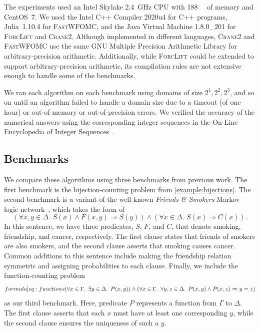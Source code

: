 \documentclass[a4paper,UKenglish,cleveref,autoref,table]{lipics-v2021}
\newcommand{\Cranetwo}{\textsc{Crane2}}
\newcommand{\friends}{\emph{Friends \& Smokers}}
\begin{document}
The experiments used an Intel Skylake \SI{2.4}{\giga\hertz} CPU with
\SI{188}{\gibi\byte} of memory and CentOS~7. We used the Intel C++ Compiler
2020u4 for C++ programs, Julia~1.10.4 for \textsc{FastWFOMC}, and the Java
Virtual Machine 1.8.0\_201 for \textsc{ForcLift} and \Cranetwo{}. Although
implemented in different languages, \Cranetwo{} and \textsc{FastWFOMC} use the
same GNU Multiple Precision Arithmetic Library for arbitrary-precision
arithmetic. Additionally, while \textsc{ForcLift} could be extended to support
arbitrary-precision arithmetic, its compilation rules are not extensive enough
to handle some of the benchmarks.

We ran each algorithm on each benchmark using domains of size
$2^{1}, 2^{2}, 2^{3}$, and so on until an algorithm failed to handle a domain
size due to a timeout (of one hour) or out-of-memory or out-of-precision errors.
We verified the accuracy of the numerical answers using the corresponding
integer sequences in the On-Line Encyclopedia of Integer Sequences~\cite{oeis}.

\subsection{Benchmarks}

We compare these algorithms using three benchmarks from previous work. The first
benchmark is the bijection-counting problem from \cref{example:bijections}. The
second benchmark is a variant of the well-known \friends{} Markov logic
network~\cite{DBLP:conf/aaai/SinglaD08,DBLP:conf/uai/BroeckCD12}, which takes
the form of
\[
  (\forall x,y \in \Delta\text{.
  } S(x) \land F(x, y) \Rightarrow S(y)) \land (\forall x \in \Delta\text{.
  }S(x) \Rightarrow C(x)).
\]
In this sentence, we have three predicates, $S$, $F$, and $C$, that denote
smoking, friendship, and cancer, respectively. The first clause states that
friends of smokers are also smokers, and the second clause asserts that smoking
causes cancer. Common additions to this sentence include making the friendship
relation symmetric and assigning probabilities to each clause. Finally, we
include the function-counting problem~\cite{DBLP:conf/kr/DilkasB23}
\begin{equation}\label[formula]{eq:functions}
  (\forall x \in \Gamma\text{. }\exists y \in \Delta\text{.
  }P(x, y)) \land (\forall x \in \Gamma\text{. }\forall y, z \in \Delta\text{.
  }P(x, y) \land P(x, z) \Rightarrow y = z)
\end{equation}
as our third benchmark. Here, predicate $P$ represents a function from $\Gamma$
to $\Delta$. The first clause asserts that each $x$ must have at least one
corresponding $y$, while the second clause ensures the uniqueness of such a $y$.
\end{document}
